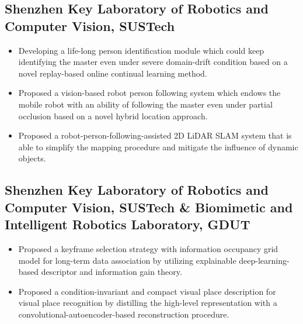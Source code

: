 \documentclass[12pt,a4paper,sans]{moderncv} %
\begin{document}
\subsection{Shenzhen Key Laboratory of Robotics and Computer Vision, SUSTech}
{
  \begin{itemize}
    \item Developing a life-long person identification module which could keep identifying the master even under severe domain-drift condition based on a novel replay-based online continual learning method.
    \item Proposed a vision-based robot person following system which endows the mobile robot with an ability of following the master even under partial occlusion based on a novel hybrid location approach.
    \item Proposed a robot-person-following-assisted 2D LiDAR SLAM system that is able to simplify the mapping procedure and mitigate the influence of dynamic objects.
  \end{itemize}
}

\subsection{Shenzhen Key Laboratory of Robotics and Computer Vision, SUSTech \&  Biomimetic and Intelligent Robotics Laboratory, GDUT}

{
  \begin{itemize}
    \item Proposed a keyframe selection strategy with information occupancy grid model for long-term data association by utilizing explainable deep-learning-based descriptor and information gain theory.
    \item Proposed a condition-invariant and compact visual place description for visual place recognition by distilling the high-level representation with a convolutional-autoencoder-based reconstruction procedure.
  \end{itemize}
}
\end{document}
